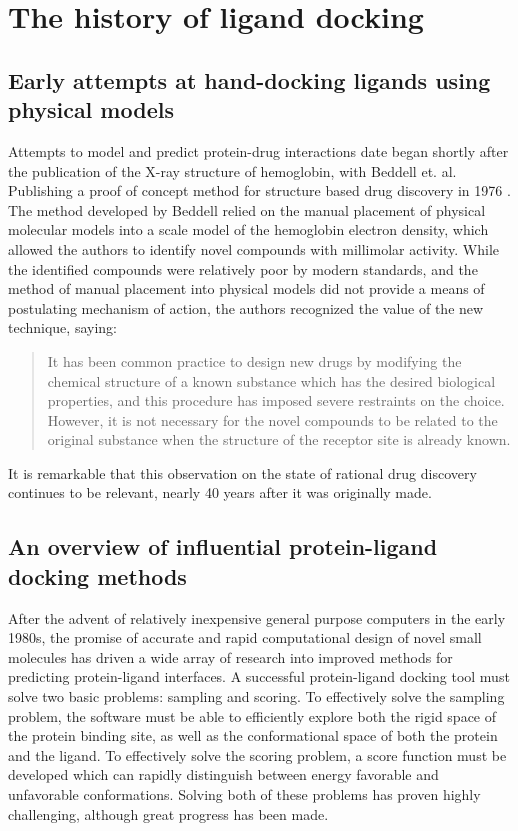 \section{The history of ligand docking}

\subsection{Early attempts at hand-docking ligands using physical models}
Attempts to model and predict protein-drug interactions date began shortly after the publication of the X-ray structure of hemoglobin, with Beddell et. al. Publishing a proof of concept method for structure based drug discovery in 1976 \citep{BEDDELL:1976go}.
The method developed by Beddell relied on the manual placement of physical molecular models into a scale model of the hemoglobin electron density, which allowed the authors to identify novel compounds with millimolar activity.
While the identified compounds were relatively poor by modern standards, and the method of manual placement into physical models did not provide a means of postulating mechanism of action, the authors recognized the value of the new technique, saying:
\begin{quote}
It has been common practice to design new drugs by modifying the chemical structure of a known substance which has the desired biological properties, and this procedure has imposed severe restraints on the choice.
However, it is not necessary for the novel compounds to be related to the original substance when the structure of the receptor site is already known.
\end{quote}
It is remarkable that this observation on the state of rational drug discovery continues to be relevant, nearly 40 years after it was originally made.

\subsection{An overview of influential protein-ligand docking methods}
After the advent of relatively inexpensive general purpose computers in the early 1980s, the promise of accurate and rapid computational design of novel small molecules has driven a wide array of research into improved methods for predicting protein-ligand interfaces.
A successful protein-ligand docking tool must solve two basic problems: sampling and scoring.
To effectively solve the sampling problem, the software must be able to efficiently explore both the rigid space of the protein binding site, as well as the conformational space of both 	the protein and the ligand.
To effectively solve the scoring problem, a score function must be developed which can rapidly distinguish between energy favorable and unfavorable conformations.
Solving both of these problems has proven highly challenging, although great progress has been made.

